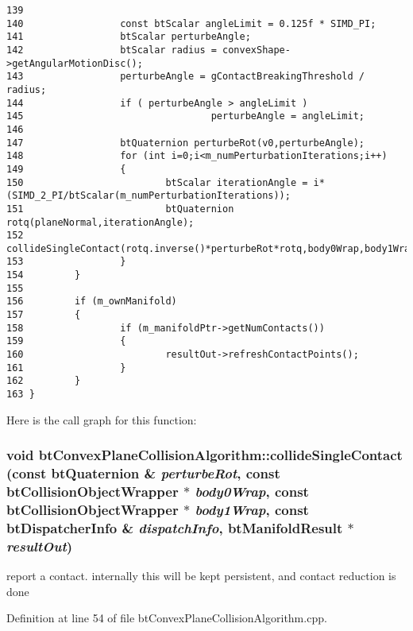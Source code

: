 \begin{Code}
\begin{verbatim}
139 
140                 const btScalar angleLimit = 0.125f * SIMD_PI;
141                 btScalar perturbeAngle;
142                 btScalar radius = convexShape->getAngularMotionDisc();
143                 perturbeAngle = gContactBreakingThreshold / radius;
144                 if ( perturbeAngle > angleLimit ) 
145                                 perturbeAngle = angleLimit;
146 
147                 btQuaternion perturbeRot(v0,perturbeAngle);
148                 for (int i=0;i<m_numPerturbationIterations;i++)
149                 {
150                         btScalar iterationAngle = i*(SIMD_2_PI/btScalar(m_numPerturbationIterations));
151                         btQuaternion rotq(planeNormal,iterationAngle);
152                         collideSingleContact(rotq.inverse()*perturbeRot*rotq,body0Wrap,body1Wrap,dispatchInfo,resultOut);
153                 }
154         }
155 
156         if (m_ownManifold)
157         {
158                 if (m_manifoldPtr->getNumContacts())
159                 {
160                         resultOut->refreshContactPoints();
161                 }
162         }
163 }
\end{verbatim}
\end{Code}




Here is the call graph for this function:\hypertarget{classbt_convex_plane_collision_algorithm_79f8384fcdc2145be9fca0057edc8b69}{
\subsubsection[collideSingleContact]{\setlength{\rightskip}{0pt plus 5cm}void btConvexPlaneCollisionAlgorithm::collideSingleContact (const {\bf btQuaternion} \& {\em perturbeRot}, \/  const btCollisionObjectWrapper $\ast$ {\em body0Wrap}, \/  const btCollisionObjectWrapper $\ast$ {\em body1Wrap}, \/  const btDispatcherInfo \& {\em dispatchInfo}, \/  {\bf btManifoldResult} $\ast$ {\em resultOut})}}
\label{classbt_convex_plane_collision_algorithm_79f8384fcdc2145be9fca0057edc8b69}




report a contact. internally this will be kept persistent, and contact reduction is done 

Definition at line 54 of file btConvexPlaneCollisionAlgorithm.cpp.

